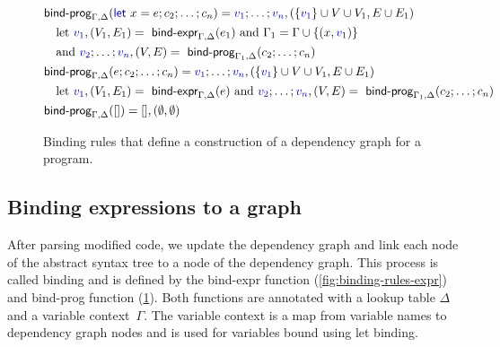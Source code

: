 \documentclass[english,crc,references=cleveref]{programming}
\theoremstyle{plain}
\theoremstyle{definition}
\newcommand{\ident}[1]{\textnormal{\textcolor{idclr}{\sffamily #1}}}
\newcommand{\kvd}[1]{\textnormal{\textcolor{kvdclr}{\sffamily #1}}}
\newcommand{\bndclr}[1]{\textcolor{kvdclr}{#1}}
\begin{document}

\begin{figure}
\begin{wide}
\begin{align}
&\ident{bind-prog}_{\Gamma, \Delta}(\kvd{let}~x=e; c_2; \ldots; c_n) = \bndclr{v_1};\ldots;\bndclr{v_n}, (\{\bndclr{v_1}\} \cup V \cup V_1, E \cup E_1)\\
&\quad \textnormal{let}~\bndclr{v_1}, (V_1,E_1) = \ident{bind-expr}_{\Gamma,\Delta}(e_1)~\textnormal{and}~\Gamma_1 = \Gamma \cup \{(x,\bndclr{v_1})\} \notag\\
&\quad \textnormal{and}~\bndclr{v_2}; \ldots; \bndclr{v_n}, (V, E) = \ident{bind-prog}_{\Gamma_1, \Delta}(c_2; \ldots; c_n)\notag\\
%
&\ident{bind-prog}_{\Gamma, \Delta}(e; c_2; \ldots; c_n) = \bndclr{v_1};\ldots;\bndclr{v_n}, (\{\bndclr{v_1}\} \cup V \cup V_1, E \cup E_1)\\
&\quad \textnormal{let}~\bndclr{v_1}, (V_1,E_1) = \ident{bind-expr}_{\Gamma,\Delta}(e)
~\textnormal{and}~\bndclr{v_2}; \ldots; \bndclr{v_n}, (V, E) = \ident{bind-prog}_{\Gamma_1, \Delta}(c_2; \ldots; c_n)\notag\\
%
&\ident{bind-prog}_{\Gamma, \Delta}([]) = [], (\emptyset, \emptyset)
\end{align}
\end{wide}
\caption{Binding rules that define a construction of a dependency graph for a program.}
\label{fig:binding-rules-prog}
%
\end{figure}



\subsection{Binding expressions to a graph}
\label{sec:formal-bind}

After parsing modified code, we update the dependency graph and link each node of the abstract
syntax tree to a node of the dependency graph. This process is called
binding and is defined by the \ident{bind-expr} function (\cref{fig:binding-rules-expr})
and \ident{bind-prog} function (\cref{fig:binding-rules-prog}). Both functions are
annotated with a lookup table $\Delta$ and a variable
context~$\Gamma$. The variable context is a map from variable names to dependency graph nodes and
is used for variables bound using \kvd{let} binding.
\end{document}
